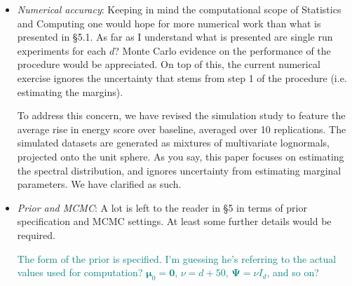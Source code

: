 \documentclass[10pt]{article}
\newcommand{\comment}[1]{\textcolor{teal}{#1}}
\newcommand{\bruno}[1]{\textcolor{red}{#1}}
\begin{document}
\begin{itemize}

\item \emph{Numerical accuracy}:  Keeping in mind the computational scope of 
    Statistics and Computing one would hope for more numerical work than what is 
    presented in §5.1. As far as I understand what is presented are single run 
    experiments for each $d$? Monte Carlo evidence on the performance of the 
    procedure would be appreciated. On top of this, the current numerical exercise
    ignores the uncertainty that stems from step 1 of the procedure 
    (i.e. estimating the margins).

To address this concern, we have revised the simulation study to feature the 
    average rise in energy score over baseline, averaged over 10 replications.  
    The simulated datasets are generated as mixtures of multivariate lognormals, 
    projected onto the unit sphere.  As you say, this paper focuses on estimating
    the spectral distribution, and ignores uncertainty from estimating marginal
    parameters.  We have clarified as such.
    

    


\item \emph{Prior and MCMC}: A lot is left to the reader in §5 in terms of
    prior specification and MCMC settings.  At least some further details would 
    be required.

    \comment{The form of the prior is specified.  I'm guessing he's referring to 
    the actual values used for computation?  $\bm{\mu}_0 = \bm{0}$, 
    $\nu = d + 50$, $\bm{\Psi} = \nu I_d$, and so on?}
    

\end{itemize}
\end{document}
